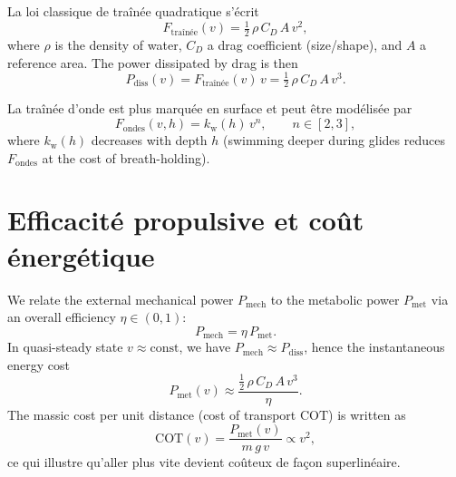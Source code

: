 \documentclass[12pt,a4paper]{article}
\begin{document}
La loi classique de traînée quadratique s'écrit
\begin{equation}
 F_{\mathrm{traînée}}(v) = \tfrac{1}{2}\,\rho\,C_D\,A\,v^2,
 \end{equation}
where $\rho$ is the density of water, $C_D$ a drag coefficient (size/shape), and $A$ a reference area. %
The power dissipated by drag is then
\begin{equation}
 P_{\mathrm{diss}}(v) = F_{\mathrm{traînée}}(v)\,v = \tfrac{1}{2}\,\rho\,C_D\,A\,v^3.
 \end{equation}

La traînée d'onde est plus marquée en surface et peut être modélisée par
\begin{equation}
 F_{\mathrm{ondes}}(v,h) = k_\mathrm{w}(h)\,v^n, \qquad n\in[2,3],
 \end{equation}
where $k_\mathrm{w}(h)$ decreases with depth $h$ (swimming deeper during glides reduces $F_{\mathrm{ondes}}$ at the cost of breath-holding).

\section{Efficacité propulsive et coût énergétique}
We relate the external mechanical power $P_{\mathrm{mech}}$ to the metabolic power $P_{\mathrm{met}}$ via an overall efficiency $\eta\in(0,1)$:
\begin{equation}
 P_{\mathrm{mech}} = \eta\, P_{\mathrm{met}}.
 \end{equation}
In quasi-steady state $v\approx\text{const}$, we have $P_{\mathrm{mech}}\approx P_{\mathrm{diss}}$, hence the instantaneous energy cost
\begin{equation}
 P_{\mathrm{met}}(v) \approx \frac{\tfrac{1}{2}\,\rho\,C_D\,A\,v^3}{\eta}.
 \end{equation}
The massic cost per unit distance (cost of transport $\mathrm{COT}$) is written as
\begin{equation}
 \mathrm{COT}(v) = \frac{P_{\mathrm{met}}(v)}{m\,g\,v} \propto v^2, 
 \end{equation}
ce qui illustre qu'aller plus vite devient coûteux de façon superlinéaire.
\end{document}
